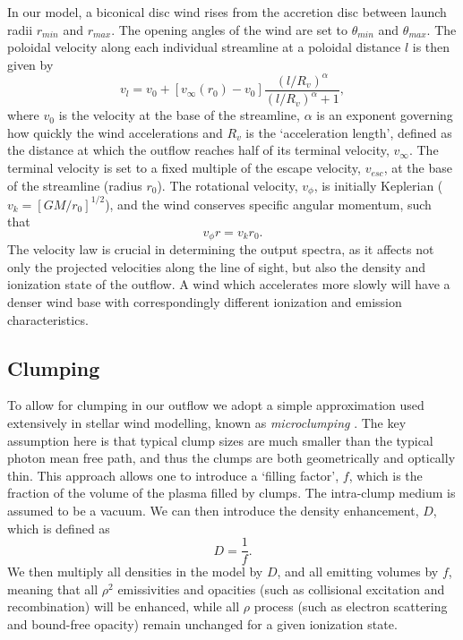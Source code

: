 \documentclass[preprint, a4paper, 11pt]{aastex}
\begin{document}
In our model, a biconical disc wind rises from the accretion 
disc between launch radii $r_{min}$ and $r_{max}$.
The opening angles of the wind are set to $\theta_{min}$ and $\theta_{max}$.
The poloidal velocity along each individual streamline at a poloidal distance $l$ 
is then given by
\begin{equation}
v_l=v_0+\left[v_{\infty}(r_0)-v_0\right]\frac{\left(l/R_v\right)^{\alpha}}{\left(l/R_v\right)^{\alpha}+1},
\label{v_law}
\end{equation}
where $v_0$ is the velocity at the base of the streamline, $\alpha$ is
an exponent governing how quickly the wind accelerations and 
$R_v$ is the `acceleration length', defined as the distance at which
the outflow reaches half of its terminal velocity, $v_{\infty}$.
The terminal velocity is set to a fixed multiple of the escape
velocity, $v_{esc}$, at the base of the streamline (radius $r_0$).
The rotational velocity, $v_{\phi}$, is initially Keplerian ($v_k = [GM/r_0]^{1/2}$),
and the wind conserves specific angular momentum, such that 
\begin{equation}
v_{\phi} r = v_k r_0.
\label{v_law}
\end{equation}
The velocity law is crucial in determining the output spectra,
as it affects not only the projected velocities along the line of sight,
but also the density and ionization state of the outflow.
A wind which accelerates more slowly will have a denser wind base
with correspondingly different ionization and emission characteristics.



\subsection{Clumping}

To allow for clumping in our outflow we adopt a simple approximation
used extensively in stellar wind modelling, known as 
{\em microclumping} \citep{hamann1998}. The key assumption here is that 
typical clump sizes are much smaller than the typical photon mean free path, 
and thus the clumps are 
both geometrically and optically thin. This approach 
allows one to introduce a `filling factor', $f$, which is the 
fraction of the volume of the plasma filled by clumps. The intra-clump
medium is assumed to be a vacuum. We can then introduce the 
density enhancement, $D$, which is defined as 
\begin{equation}
D = \frac{1}{f}.
\end{equation}
We then multiply all densities in the model by $D$, and all emitting volumes
by $f$, meaning that all $\rho^2$ emissivities and opacities
(such as collisional excitation and recombination) will be enhanced, 
while all $\rho$ process (such as electron scattering and bound-free opacity)
remain unchanged for a given ionization state. 
\end{document}

